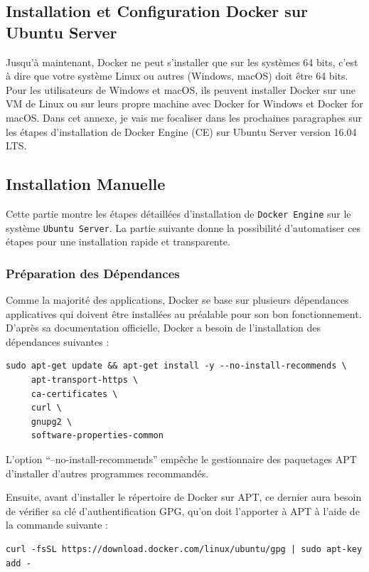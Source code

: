 \documentclass[a4paper,11pt,oneside]{report}
\begin{document}
\begin{appendices}

\chapter{Installation et Configuration Docker sur Ubuntu Server}
Jusqu'à maintenant, Docker ne peut s'installer que sur les systèmes 64 bits, c'est à dire que votre système Linux ou autres (Windows, macOS) doit être 64 bits. Pour les utilisateurs de Windows et macOS, ils peuvent installer Docker sur une VM de Linux ou sur leurs propre machine avec Docker for Windows et Docker for macOS. Dans cet annexe, je vais me focaliser dans les prochaines paragraphes sur les étapes d'installation de Docker Engine (CE) sur Ubuntu Server version 16.04 LTS.

\section{Installation Manuelle}

Cette partie montre les étapes détaillées d'installation de \texttt{Docker Engine} sur le système \texttt{Ubuntu Server}. La partie suivante donne la possibilité d'automatiser ces étapes pour une installation rapide et transparente.

\subsection{Préparation des Dépendances}
Comme la majorité des applications, Docker se base sur plusieurs dépendances applicatives qui doivent être installées au préalable pour son bon fonctionnement. D'après sa documentation\cite{dockerDocs} officielle, Docker a besoin de l'installation des dépendances suivantes :
\begin{verbatim}
sudo apt-get update && apt-get install -y --no-install-recommends \
     apt-transport-https \
     ca-certificates \    
     curl \     
     gnupg2 \     
     software-properties-common
\end{verbatim}
L'option ``--no-install-recommends'' empêche le gestionnaire des paquetages APT d'installer d'autres programmes recommandés.
\newline

Ensuite, avant d'installer le répertoire de Docker sur APT, ce dernier aura besoin de vérifier sa clé d'authentification GPG, qu'on doit l'apporter à APT à l'aide de la commande suivante :
\begin{verbatim}
curl -fsSL https://download.docker.com/linux/ubuntu/gpg | sudo apt-key add -
\end{verbatim}


\end{appendices}
\end{document}
